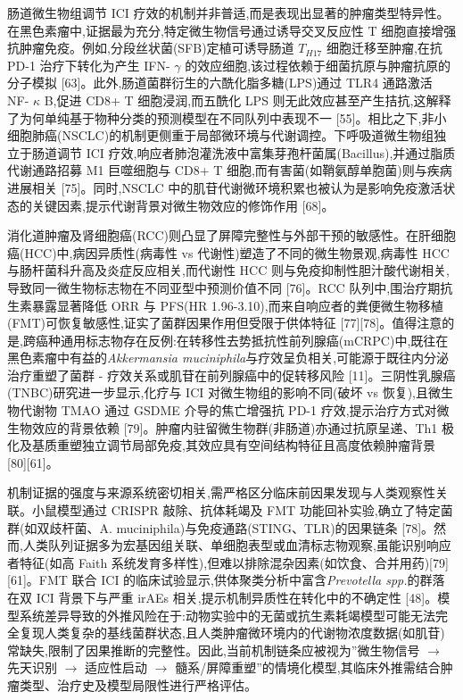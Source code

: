 \documentclass[11pt]{article}
\begin{document}
肠道微生物组调节 ICI 疗效的机制并非普适,而是表现出显著的肿瘤类型特异性。在黑色素瘤中,证据最为充分,特定微生物信号通过诱导交叉反应性 T 细胞直接增强抗肿瘤免疫。例如,分段丝状菌(SFB)定植可诱导肠道 \(T_{H17}\) 细胞迁移至肿瘤,在抗 PD-1 治疗下转化为产生 IFN- \(\gamma\) 的效应细胞,该过程依赖于细菌抗原与肿瘤抗原的分子模拟 {[}63{]}。此外,肠道菌群衍生的六酰化脂多糖(LPS)通过 TLR4 通路激活 NF- \(\kappa\) B,促进 CD8+ T 细胞浸润,而五酰化 LPS 则无此效应甚至产生拮抗,这解释了为何单纯基于物种分类的预测模型在不同队列中表现不一 {[}55{]}。相比之下,非小细胞肺癌(NSCLC)的机制更侧重于局部微环境与代谢调控。下呼吸道微生物组独立于肠道调节 ICI 疗效,响应者肺泡灌洗液中富集芽孢杆菌属(Bacillus),并通过脂质代谢通路招募 M1 巨噬细胞与 CD8+ T 细胞,而有害菌(如鞘氨醇单胞菌)则与疾病进展相关 {[}75{]}。同时,NSCLC 中的肌苷代谢微环境积累也被认为是影响免疫激活状态的关键因素,提示代谢背景对微生物效应的修饰作用 {[}68{]}。

消化道肿瘤及肾细胞癌(RCC)则凸显了屏障完整性与外部干预的敏感性。在肝细胞癌(HCC)中,病因异质性(病毒性 vs 代谢性)塑造了不同的微生物景观,病毒性 HCC 与肠杆菌科升高及炎症反应相关,而代谢性 HCC 则与免疫抑制性胆汁酸代谢相关,导致同一微生物标志物在不同亚型中预测价值不同 {[}76{]}。RCC 队列中,围治疗期抗生素暴露显著降低 ORR 与 PFS(HR 1.96-3.10),而来自响应者的粪便微生物移植(FMT)可恢复敏感性,证实了菌群因果作用但受限于供体特征 {[}77{]}{[}78{]}。值得注意的是,跨癌种通用标志物存在反例:在转移性去势抵抗性前列腺癌(mCRPC)中,既往在黑色素瘤中有益的\emph{Akkermansia muciniphila}与疗效呈负相关,可能源于既往内分泌治疗重塑了菌群 - 疗效关系或肌苷在前列腺癌中的促转移风险 {[}11{]}。三阴性乳腺癌(TNBC)研究进一步显示,化疗与 ICI 对微生物组的影响不同(破坏 vs 恢复),且微生物代谢物 TMAO 通过 GSDME 介导的焦亡增强抗 PD-1 疗效,提示治疗方式对微生物效应的背景依赖 {[}79{]}。肿瘤内驻留微生物群(非肠道)亦通过抗原呈递、Th1 极化及基质重塑独立调节局部免疫,其效应具有空间结构特征且高度依赖肿瘤背景 {[}80{]}{[}61{]}。

机制证据的强度与来源系统密切相关,需严格区分临床前因果发现与人类观察性关联。小鼠模型通过 CRISPR 敲除、抗体耗竭及 FMT 功能回补实验,确立了特定菌群(如双歧杆菌、A. muciniphila)与免疫通路(STING、TLR)的因果链条 {[}78{]}。然而,人类队列证据多为宏基因组关联、单细胞表型或血清标志物观察,虽能识别响应者特征(如高 Faith 系统发育多样性),但难以排除混杂因素(如饮食、合并用药){[}79{]}{[}61{]}。FMT 联合 ICI 的临床试验显示,供体聚类分析中富含\emph{Prevotella spp.}的群落在双 ICI 背景下与严重 irAEs 相关,提示机制异质性在转化中的不确定性 {[}48{]}。模型系统差异导致的外推风险在于:动物实验中的无菌或抗生素耗竭模型可能无法完全复现人类复杂的基线菌群状态,且人类肿瘤微环境内的代谢物浓度数据(如肌苷)常缺失,限制了因果推断的完整性。因此,当前机制链条应被视为''微生物信号 \(\rightarrow\) 先天识别 \(\rightarrow\) 适应性启动 \(\rightarrow\) 髓系/屏障重塑''的情境化模型,其临床外推需结合肿瘤类型、治疗史及模型局限性进行严格评估。
\end{document}
